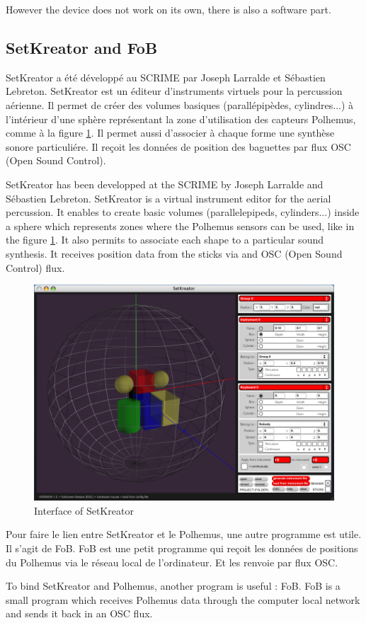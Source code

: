However the device does not work on its own, there is also a software part.

\subsection{SetKreator and FoB}

SetKreator a été développé au \ac{SCRIME} par Joseph Larralde et Sébastien Lebreton. SetKreator est un éditeur d'instruments virtuels pour la percussion aérienne. Il permet de créer des volumes basiques (parallépipèdes, cylindres...) à l'intérieur d'une sphère représentant la zone d'utilisation des capteurs Polhemus, comme à la figure \ref{fig:setkreator}. Il permet aussi d'associer à chaque forme une synthèse sonore particuliére. Il reçoit les données de position des baguettes par flux OSC (Open Sound Control).

SetKreator has been developped at the \ac{SCRIME} by Joseph Larralde and Sébastien Lebreton. SetKreator is a virtual instrument editor for the aerial percussion. It enables to create basic volumes (parallelepipeds, cylinders...) inside a sphere which represents zones where the Polhemus sensors can be used, like in the figure \ref{fig:setkreator}. It also permits to associate each shape to a particular sound synthesis. It receives position data from the sticks via and OSC (Open Sound Control) flux.
\begin{figure}[h!]
\centering\includegraphics[scale=0.3]{image/setkreator.png}
\caption{Interface of SetKreator}
\label{fig:setkreator}
\end{figure}


Pour faire le lien entre SetKreator et le Polhemus, une autre programme est utile. Il s'agit de FoB. FoB est une petit programme qui reçoit les données de positions du Polhemus via le réseau local de l'ordinateur. Et les renvoie par flux OSC.

To bind SetKreator and Polhemus, another program is useful : FoB. FoB is a small program which receives Polhemus data through the computer local network and sends it back in an OSC flux.


